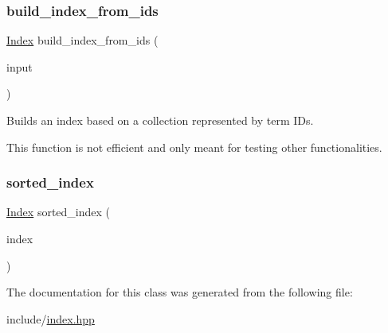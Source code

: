 \subsubsection{\texorpdfstring{build\+\_\+index\+\_\+from\+\_\+ids}{build\_index\_from\_ids}}
{\footnotesize\ttfamily \hyperlink{classbloodhound_1_1index_1_1Index}{Index} build\+\_\+index\+\_\+from\+\_\+ids (\begin{DoxyParamCaption}\item[{const std\+::vector$<$ std\+::vector$<$ \hyperlink{structbloodhound_1_1TermWeight}{Term\+Weight} $>$$>$ \&}]{input }\end{DoxyParamCaption})\hspace{0.3cm}{\ttfamily [friend]}}

Builds an index based on a collection represented by term I\+Ds.

This function is not efficient and only meant for testing other functionalities. \mbox{\label{classbloodhound_1_1index_1_1Index_a835545d5a58db5d720a5a31d71559084}} 
\subsubsection{\texorpdfstring{sorted\+\_\+index}{sorted\_index}}
{\footnotesize\ttfamily \hyperlink{classbloodhound_1_1index_1_1Index}{Index} sorted\+\_\+index (\begin{DoxyParamCaption}\item[{const \hyperlink{classbloodhound_1_1index_1_1Index}{Index} \&}]{index }\end{DoxyParamCaption})\hspace{0.3cm}{\ttfamily [friend]}}



The documentation for this class was generated from the following file\+:\begin{DoxyCompactItemize}
\item 
include/\hyperlink{index_8hpp}{index.\+hpp}\end{DoxyCompactItemize}
